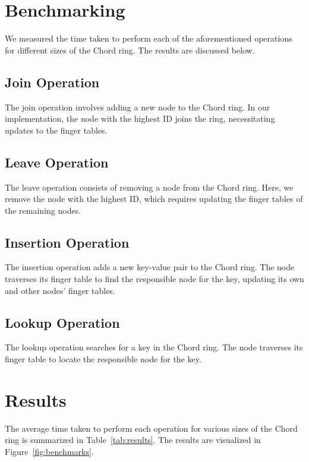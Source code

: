 \documentclass[12pt]{article}
\begin{document}
    \section{Benchmarking}\label{sec:benchmarking}
    We measured the time taken to perform each of the aforementioned operations for different sizes of the Chord ring.
    The results are discussed below.

    \subsection{Join Operation}\label{subsec:join-operation}
    The join operation involves adding a new node to the Chord ring.
    In our implementation, the node with the highest ID joins the ring, necessitating updates to the finger tables.

    \subsection{Leave Operation}\label{subsec:leave-operation}
    The leave operation consists of removing a node from the Chord ring.
    Here, we remove the node with the highest ID, which requires updating the finger tables of the remaining nodes.

    \subsection{Insertion Operation}\label{subsec:insertion-operation}
    The insertion operation adds a new key-value pair to the Chord ring.
    The node traverses its finger table to find the responsible node for the key, updating its own and other nodes' finger tables.

    \subsection{Lookup Operation}\label{subsec:lookup-operation}
    The lookup operation searches for a key in the Chord ring.
    The node traverses its finger table to locate the responsible node for the key.


    \section{Results}\label{sec:results}
    The average time taken to perform each operation for various sizes of the Chord ring is summarized in Table~\ref{tab:results}.
    The results are visualized in Figure~\ref{fig:benchmarks}.
\end{document}
